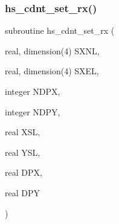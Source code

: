 \subsubsection{\texorpdfstring{hs\+\_\+cdnt\+\_\+set\+\_\+rx()}{hs\_cdnt\_set\_rx()}}
{\footnotesize\ttfamily subroutine hs\+\_\+cdnt\+\_\+set\+\_\+rx (\begin{DoxyParamCaption}\item[{real, dimension(4)}]{S\+X\+NL,  }\item[{real, dimension(4)}]{S\+X\+EL,  }\item[{integer}]{N\+D\+PX,  }\item[{integer}]{N\+D\+PY,  }\item[{real}]{X\+SL,  }\item[{real}]{Y\+SL,  }\item[{real}]{D\+PX,  }\item[{real}]{D\+PY }\end{DoxyParamCaption})}

\mbox{\label{Leroi__c_8f90_a940c66015c19ed9dab8214acf582b96c}} 

